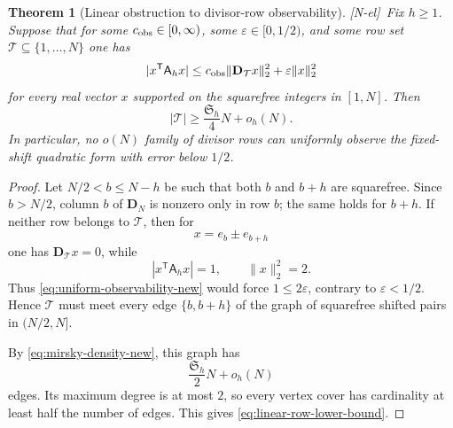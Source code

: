 \documentclass[11pt,reqno]{amsart}
\numberwithin{equation}{section}
\theoremstyle{plain}
\newtheorem{theorem}{Theorem}[section]
\theoremstyle{definition}
\theoremstyle{remark}
\newcommand{\tagNE}{\textup{[N-el]}}
\begin{document}
\begin{theorem}[Linear obstruction to divisor-row observability]
\label{thm:linear-observability-obstruction}
\tagNE\ Fix $h\ge1$.  Suppose that for some $c_{\rm obs}\in[0,\infty)$, some $\varepsilon\in[0,1/2)$, and some row set $\mathcal T\subseteq\{1,\dots,N\}$ one has
\begin{equation}
|x^{\mathsf T}\mathsf A_hx|
\le
c_{\rm obs}\|\mathbf D_\mathcal T x\|_2^2
+
\varepsilon\|x\|_2^2
\label{eq:uniform-observability-new}
\end{equation}
for every real vector $x$ supported on the squarefree integers in $[1,N]$.  Then
\begin{equation}
|\mathcal T|
\ge
\frac{\mathfrak S_h}{4}N+o_h(N).
\label{eq:linear-row-lower-bound}
\end{equation}
In particular, no $o(N)$ family of divisor rows can uniformly observe the fixed-shift quadratic form with error below $1/2$.
\end{theorem}

\begin{proof}
Let $N/2<b\le N-h$ be such that both $b$ and $b+h$ are squarefree.  Since $b>N/2$, column $b$ of $\mathbf D_N$ is nonzero only in row $b$; the same holds for $b+h$.  If neither row belongs to $\mathcal T$, then for
\begin{equation}
x=e_b\pm e_{b+h}
\end{equation}
one has $\mathbf D_\mathcal T x=0$, while
\begin{equation}
|x^{\mathsf T}\mathsf A_hx|=1,
\qquad
\|x\|_2^2=2.
\end{equation}
Thus \eqref{eq:uniform-observability-new} would force $1\le2\varepsilon$, contrary to $\varepsilon<1/2$.  Hence $\mathcal T$ must meet every edge $\{b,b+h\}$ of the graph of squarefree shifted pairs in $(N/2,N]$.

By \eqref{eq:mirsky-density-new}, this graph has
\begin{equation}
\frac{\mathfrak S_h}{2}N+o_h(N)
\end{equation}
edges.  Its maximum degree is at most $2$, so every vertex cover has cardinality at least half the number of edges.  This gives \eqref{eq:linear-row-lower-bound}.
\end{proof}
\end{document}
